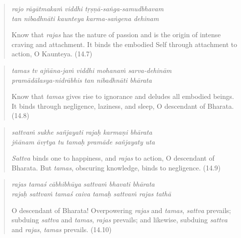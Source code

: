 \documentclass[12pt, twoside, openright]{memoir}
\begin{document}
\par
\begin{verse}
\textit{rajo rāgātmakaṁ viddhi tṛṣṇā-saṅga-samudbhavam} \\
\textit{tan nibadhnāti kaunteya karma-saṅgena dehinam}

\noindent Know that \textit{rajas} has the nature of passion and is the origin of intense craving and attachment. It binds the embodied Self through attachment to action, O Kaunteya. (14.7)
\end{verse}
\par



\par
\begin{verse}
\textit{tamas tv ajñāna-jaṁ viddhi mohanaṁ sarva-dehinām} \\
\textit{pramādālasya-nidrābhis tan nibadhnāti bhārata}

\noindent Know that \textit{tamas} gives rise to ignorance and deludes all embodied beings. It binds through negligence, laziness, and sleep, O descendant of Bharata. (14.8)
\end{verse}
\par



\par
\begin{verse}
\textit{sattvaṁ sukhe sañjayati rajaḥ karmaṇi bhārata} \\
\textit{jñānam āvṛtya tu tamaḥ pramāde sañjayaty uta}

\noindent \textit{Sattva} binds one to happiness, and \textit{rajas} to action, O descendant of Bharata. But \textit{tamas}, obscuring knowledge, binds to negligence. (14.9)
\end{verse}
\par



\par
\begin{verse}
\textit{rajas tamaś cābhibhūya sattvaṁ bhavati bhārata} \\
\textit{rajaḥ sattvaṁ tamaś caiva tamaḥ sattvaṁ rajas tathā}

\noindent O descendant of Bharata! Overpowering \textit{rajas} and \textit{tamas}, \textit{sattva} prevails; subduing \textit{sattva} and \textit{tamas}, \textit{rajas} prevails; and likewise, subduing \textit{sattva} and \textit{rajas}, \textit{tamas} prevails. (14.10)
\end{verse}
\par
\end{document}
